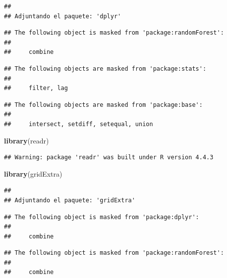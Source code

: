 \documentclass[
]{article}
\newenvironment{Shaded}{\begin{snugshade}}{\end{snugshade}}
\newcommand{\FunctionTok}[1]{\textcolor[rgb]{0.13,0.29,0.53}{\textbf{#1}}}
\newcommand{\NormalTok}[1]{#1}
\begin{document}
\begin{verbatim}
## 
## Adjuntando el paquete: 'dplyr'
\end{verbatim}

\begin{verbatim}
## The following object is masked from 'package:randomForest':
## 
##     combine
\end{verbatim}

\begin{verbatim}
## The following objects are masked from 'package:stats':
## 
##     filter, lag
\end{verbatim}

\begin{verbatim}
## The following objects are masked from 'package:base':
## 
##     intersect, setdiff, setequal, union
\end{verbatim}

\begin{Shaded}
\begin{Highlighting}[]
\FunctionTok{library}\NormalTok{(readr)}
\end{Highlighting}
\end{Shaded}

\begin{verbatim}
## Warning: package 'readr' was built under R version 4.4.3
\end{verbatim}

\begin{Shaded}
\begin{Highlighting}[]
\FunctionTok{library}\NormalTok{(gridExtra)}
\end{Highlighting}
\end{Shaded}

\begin{verbatim}
## 
## Adjuntando el paquete: 'gridExtra'
\end{verbatim}

\begin{verbatim}
## The following object is masked from 'package:dplyr':
## 
##     combine
\end{verbatim}

\begin{verbatim}
## The following object is masked from 'package:randomForest':
## 
##     combine
\end{verbatim}
\end{document}
